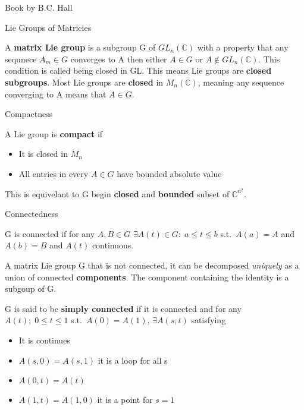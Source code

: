 \documentclass[12pt, letterpaper]{article}
\newcommand{\C}{\mathbb{C}}
\begin{document}
\begin{section}{Book by B.C. Hall}

  \begin{subsection}{Lie Groups of Matricies}

    A \textbf{matrix Lie group} is a subgroup G of \(GL_{n}(\C)\) with a
    property that any sequnece \(A_{m} \in G\) converges to A then either
    \(A \in G\) or \(A \notin GL_{n}(\C)\). This condition is called being
    closed in GL. This means Lie groups are \textbf{closed subgroups}. Most
    Lie groups are \textbf{closed} in \(M_{n}(\C)\), meaning any sequence
    converging to A means that \(A \in G\).

    \begin{subsubsection}{Compactness}

      A Lie group is \textbf{compact} if
      \begin{itemize}
        \item It is closed in \(M_{n}\)
        \item All entries in every \(A \in G\) have bounded absolute value
      \end{itemize}
      This is equivelant to G begin \textbf{closed} and \textbf{bounded} subset
      of \(\C^{n^{2}}\).

    \end{subsubsection}

    \begin{subsubsection}{Connectedness}

      G is connected if for any \(A, B \in G\) \(\exists A(t) \in G: \;
      a \leq t \leq b\) s.t.\ \(A(a) = A\) and \(A(b) = B\) and \(A(t)\)
      continuous.

      A matrix Lie group G that is not connected, it can be decomposed
      \textit{uniquely} as a union of connected \textbf{components}. The
      component containing the identity is a subgoup of G.

      G is said to be \textbf{simply connected} if it is connected and for any
      \(A(t); \; 0 \leq t \leq 1\) s.t.\ \(A(0) = A(1)\), \(\exists A(s, t)\)
      satisfying
      \begin{itemize}
        \item It is continues
        \item \(A(s, 0) = A(s, 1)\) it is a loop for all s
        \item \(A(0, t) = A(t)\)
        \item \(A(1, t) = A(1, 0)\) it is a point for \(s = 1\)
      \end{itemize}


\end{subsubsection}
\end{subsection}
\end{section}
\end{document}
